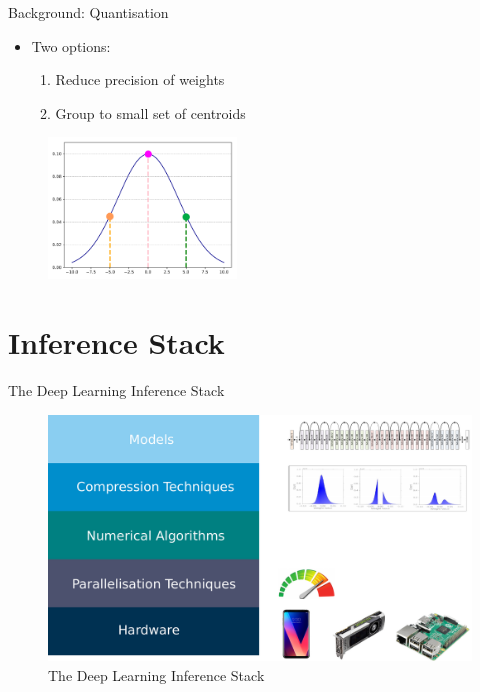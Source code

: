\documentclass{beamer}
\begin{document}
\begin{frame}{Background: Quantisation}
\begin{itemize}
    \item Two options:
    \begin{enumerate}
        \item Reduce precision of weights
        \item Group to small set of centroids
    \end{enumerate}
\end{itemize}

\begin{figure}
    \centering
    \includegraphics[width=5cm]{images/quantization.pdf}
\end{figure}


\end{frame}


\section{Inference Stack}

\begin{frame}{The Deep Learning Inference Stack}
\begin{figure}
    \centering
    \includegraphics[width=\linewidth]{images/inference-stack.pdf}
    \caption{The Deep Learning Inference Stack}
    \label{fig:inference-stack}
\end{figure}
\end{frame}
\end{document}
